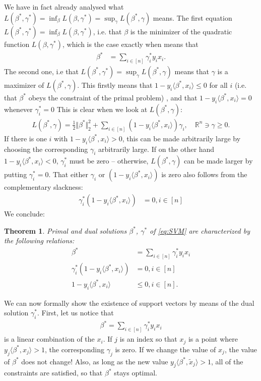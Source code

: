 \documentclass{article}
\newcommand{\sprod}[1]{\langle #1 \rangle}
\newcommand{\R}{\mathbb{R}}
\newtheorem{theorem}{Theorem}
\newcommand{\norm}[1]{\Vert #1 \Vert}
\begin{document}
We have in fact already analysed what $L(\beta^*,\gamma^*) = \inf_{\beta} L(\beta,\gamma^*) = \sup_\gamma L(\beta^*,\gamma)$ means. The first equation $L(\beta^*,\gamma^*) = \inf_{\beta} L(\beta,\gamma^*)$, i.e. that $\beta$ is the minimizer of the quadratic function $L(\beta,\gamma^*)$, which is the case exactly when
means that
\begin{align*}
     \beta^* &= \sum_{i \in [n]} \gamma_i^* y_i x_i.
\end{align*}
The second one, i.e that $L(\beta^*,\gamma^*)=\sup_\gamma L(\beta^*,\gamma)$ means that $\gamma$ is a maximizer of $L(\beta^*,\gamma)$. This firstly means that $1-y_i \sprod{\beta^*,x_i} \leq 0$ for all $i$ (i.e. that $\beta^*$ obeys the constraint of the primal problem) , and that $1-y_i \sprod{\beta^*,x_i} = 0$ whenever $\gamma_i^*=0$  This is clear when we look at $L(\beta^*,\gamma)$:
\begin{align*}
    L(\beta^*, \gamma) = \tfrac{1}{2}\norm{\beta^*}_2^2 + \sum_{i\in [n]}(1-y_i\sprod{\beta^*,x_i})\gamma_i, \quad  \R^n \ni \gamma \geq 0.
\end{align*}
If there is one $i$ with $1-y_i \sprod{\beta^*,x_i} >0$, this can be made arbitrarily large by choosing the corresponding $\gamma_i$ arbitrarily large. If on the other hand $1-y_i \sprod{\beta^*,x_i} <0$, $\gamma_i^*$ must be zero -- otherwise, $L(\beta^*,\gamma)$ can be made larger by putting $\gamma_i^*=0$. That either $\gamma_i$ or $(1-y_i\sprod{\beta^*,x_i})$ is zero also follows from the complementary slackness: 
\begin{align*}
    \gamma_i^* (1-y_i\sprod{\beta^*,x_i})&=0 , i \in [n]
\end{align*}
We conclude:
\begin{theorem}
    Primal and dual solutions $\beta^*$, $\gamma^*$ of \eqref{eq:SVM} are characterized by the following relations:
    \begin{align*}
        \beta^* &= \sum_{i \in [n]} \gamma_i^* y_i x_i \\
        \gamma_i^* (1-y_i\sprod{\beta^*,x_i})&=0 , i \in [n] \\
        1-y_i \sprod{\beta^*,x_i} &\leq 0, i \in [n].
    \end{align*}
    
\end{theorem}
We can now formally show the existence of support vectors by means of the dual solution $\gamma_i^*$. First, let us notice that 
\begin{align*}
    \beta^* = \sum_{i \in [n]}\gamma_i^*y_ix_i
\end{align*}
is a linear combination of the $x_i$. If $j$ is an index so that $x_j$ is a point where $y_j\sprod{\beta^*,x_j}>1$, the corresponding $\gamma_j$ is zero. If we change the value of $x_j$, the value of $\beta^*$ does not change! Also, as long as the new value $y_j\sprod{\beta^*,\tilde{x}_j}>1$, all of the constraints are satisfied, so that $\beta^*$ stays optimal.
\end{document}
